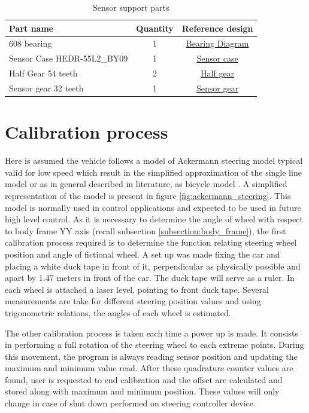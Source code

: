 \begin{table}[!hb]
    \centering
	\begin{tabular}{lcc}
		\toprule
		\textbf{Part name} & \textbf{Quantity} & \textbf{Reference design}\\
		\midrule
		608 bearing & 1 & \hyperref[draw:bearing]{Bearing Diagram}\\
		Sensor Case HEDR-55L2\_BY09 & 1 & \hyperref[draw:sensor-case]{Sensor case}\\
        Half Gear 54 teeth & 2 & \hyperref[draw:half-gear]{Half gear}\\
        Sensor gear 32 teeth & 1 & \hyperref[draw:sensor-gear]{Sensor gear}\\
		\bottomrule
	\end{tabular}
\caption{Sensor support parts}
\label{tab:sensor_support_parts}
\end{table}


\section{Calibration process}
Here is assumed the vehicle follows a model of Ackermann steering model typical valid for low speed which result in the simplified approximation of the single line model or as in general described in literature, as bicycle model\cite{Snider2009} \cite{Navigation_System_Design}. A simplified representation of the model is present in figure \ref{fig:ackermann_steering}. This model is normally used in control applications and expected to be used in future high level control. As it is necessary to determine the angle of wheel with respect to body frame YY axis (recall subsection \ref{subsection:body_frame}), the first calibration process required is to determine the function relating steering wheel position and angle of fictional wheel. A set up was made fixing the car and placing a white duck tape in front of it, perpendicular as physically possible and apart by 1.47 meters in front of the car. The duck tape will serve as a ruler. In each wheel is attached a laser level, pointing to front duck tape. Several measurements are take for different steering position values and using trigonometric relations, the angles of each wheel is estimated. 

The other calibration process is taken each time a power up is made. It consists in performing a full rotation of the steering wheel to each extreme points. During this movement, the program is always reading sensor position and updating the maximum and minimum value read. After these quadrature counter values are found, user is requested to end calibration and the offset are calculated and stored along with maximum and minimum position. These values will only change in case of shut down performed on steering controller device.

